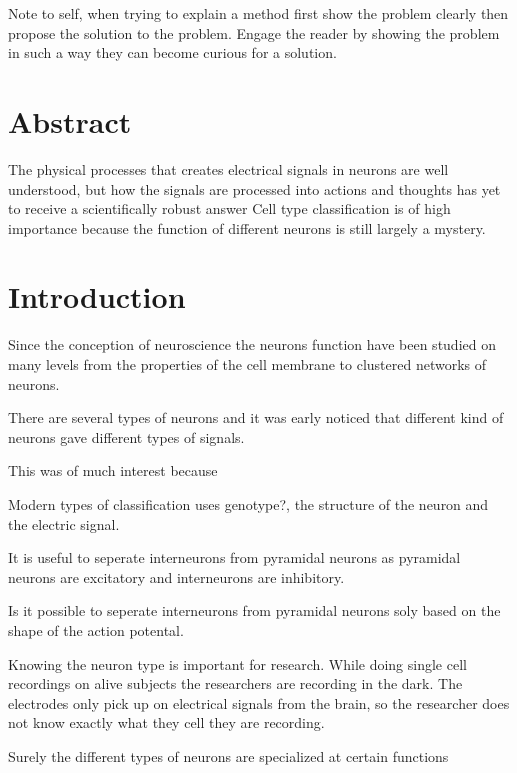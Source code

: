 \documentclass[altfont, fleqn]{uiophd}
\begin{document}
Note to self, when trying to explain a method first show the problem clearly
then propose the solution to the problem. Engage the reader by showing the 
problem in such a way they can become curious for a solution. 


\chapter*{Abstract}
\noindent
The physical processes that creates electrical signals in neurons are well understood, 
but how the signals are processed into actions and thoughts has yet to 
receive a scientifically robust answer
Cell type classification is of high importance because the function of different 
neurons is still largely a mystery. 
\setcounter{tocdepth}{1}
\startcontents
\tableofcontents
\chapter{Introduction}

Since 
the conception of neuroscience the neurons function have been studied on many levels
from the properties of the cell membrane to clustered networks of neurons.


There are several types of neurons 
and it was early noticed that different kind of neurons gave different
types of signals. 

This was of much interest because 


Modern types of 
classification uses genotype?, the structure of the neuron and the 
electric signal.

It is useful to seperate interneurons from pyramidal neurons as
pyramidal neurons are excitatory and interneurons are inhibitory. 

Is it possible to seperate interneurons from pyramidal neurons soly
based on the shape of the action potental. 

Knowing the neuron type is important for research. 
While doing single cell recordings on alive subjects the researchers are
recording in the dark. 
The electrodes only pick up on electrical signals from the brain, 
so the researcher does not know exactly what they cell they are recording. 

Surely the different types of neurons are specialized at certain functions
\end{document}
